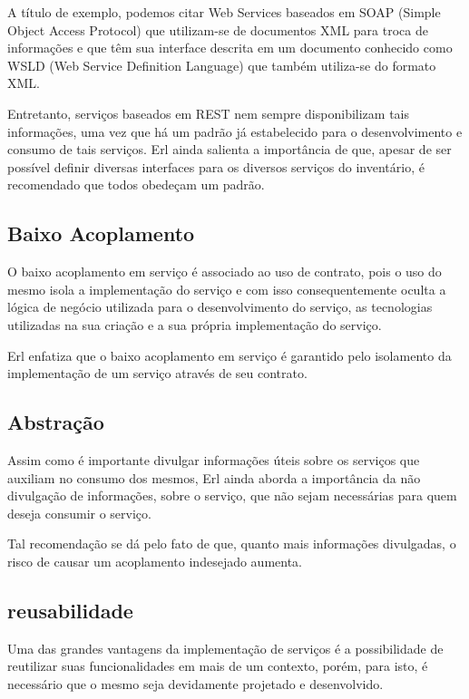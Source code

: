 \documentclass[12pt]{article}
\begin{document}
A título de exemplo, podemos citar Web Services baseados em SOAP (Simple Object Access Protocol) que utilizam-se de documentos XML para troca de informações e que têm sua interface descrita em um documento conhecido como WSLD (Web Service Definition Language) que também utiliza-se do formato XML.

Entretanto, serviços baseados em REST nem sempre disponibilizam tais informações, uma vez que há um padrão já estabelecido para o desenvolvimento e consumo de tais serviços.
Erl ainda salienta a importância de que, apesar de ser possível definir diversas interfaces para os diversos serviços do inventário, é recomendado que todos obedeçam um padrão.

\subsection{Baixo Acoplamento}

O baixo acoplamento em serviço é associado ao uso de contrato, pois o uso do mesmo isola a implementação do serviço e com isso consequentemente oculta a lógica de negócio utilizada para o desenvolvimento do serviço, as tecnologias utilizadas na sua criação e a sua própria implementação do serviço.

Erl enfatiza que o baixo acoplamento em serviço é garantido pelo isolamento da implementação de um serviço através de seu contrato.

\subsection{Abstração}

Assim como é importante divulgar informações úteis sobre os serviços que auxiliam no consumo dos mesmos, Erl ainda aborda a importância da não divulgação de informações, sobre o serviço, que não sejam necessárias para quem deseja consumir o serviço.

Tal recomendação se dá pelo fato de que, quanto mais informações divulgadas, o risco de causar um acoplamento indesejado aumenta.

\subsection{reusabilidade} %
\label{sub:reusabilidade}
Uma das grandes vantagens da implementação de serviços é a possibilidade de reutilizar suas funcionalidades em mais de um contexto, porém, para isto, é necessário que o mesmo seja devidamente projetado e desenvolvido.
\end{document}
